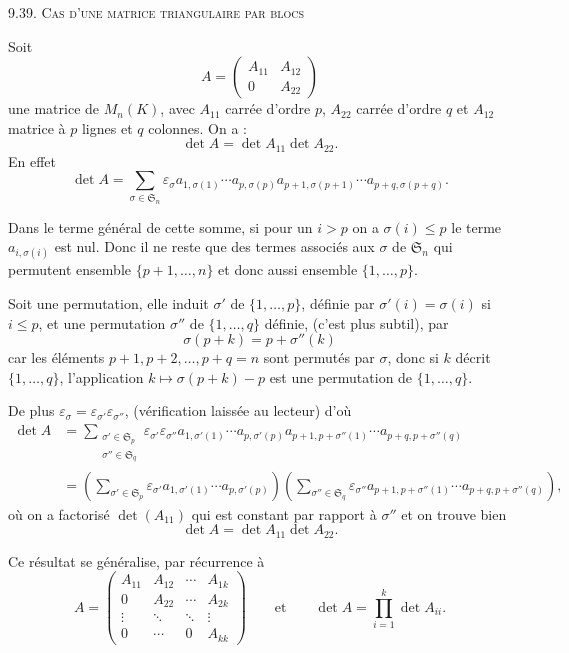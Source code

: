 \medskip\noindent\textsc{9.39. Cas d'une matrice triangulaire par blocs}

Soit
\[
A=\begin{pmatrix}A_{11}&A_{12}\\0&A_{22}\end{pmatrix}
\]
une matrice de $M_n(K)$, avec $A_{11}$ carrée d'ordre $p$, $A_{22}$ carrée d'ordre $q$ et $A_{12}$ matrice à $p$ lignes et $q$ colonnes. On a :
\[
\det A=\det A_{11}\det A_{22}.
\]
En effet
\[
\det A=\sum_{\sigma\in\mathfrak S_n}\varepsilon_\sigma
 a_{1,\sigma(1)}\cdots a_{p,\sigma(p)}a_{p+1,\sigma(p+1)}\cdots a_{p+q,\sigma(p+q)}.
\]

Dans le terme général de cette somme, si pour un $i>p$ on a $\sigma(i)\le p$ le terme $a_{i,\sigma(i)}$ est nul. Donc il ne reste que des termes associés aux $\sigma$ de $\mathfrak S_n$ qui permutent ensemble $\{p+1,\ldots,n\}$ et donc aussi ensemble $\{1,\ldots,p\}$.

Soit une permutation, elle induit  $\sigma'$ de $\{1,\ldots,p\}$, définie par $\sigma'(i)=\sigma(i)$ si $i\le p$, et une permutation $\sigma''$ de $\{1,\ldots,q\}$ définie, (c'est plus subtil), par
\[
\sigma(p+k)=p+\sigma''(k)
\]
car les éléments $p+1,p+2,\ldots,p+q=n$ sont permutés par $\sigma$, donc si $k$ décrit $\{1,\ldots,q\}$, l'application $k\longmapsto\sigma(p+k)-p$ est une permutation de $\{1,\ldots,q\}$.

De plus $\varepsilon_\sigma=\varepsilon_{\sigma'}\varepsilon_{\sigma''}$, (vérification laissée au lecteur) d'où
\[
\begin{aligned}
\det A
&=\sum_{\substack{\sigma'\in\mathfrak S_p\\\sigma''\in\mathfrak S_q}}
\varepsilon_{\sigma'}\varepsilon_{\sigma''}
 a_{1,\sigma'(1)}\cdots a_{p,\sigma'(p)}
 a_{p+1,p+\sigma''(1)}\cdots a_{p+q,p+\sigma''(q)}\\
&=\left(\sum_{\sigma'\in\mathfrak S_p}\varepsilon_{\sigma'}a_{1,\sigma'(1)}\cdots a_{p,\sigma'(p)}\right)
\left(\sum_{\sigma''\in\mathfrak S_q}\varepsilon_{\sigma''}a_{p+1,p+\sigma''(1)}\cdots a_{p+q,p+\sigma''(q)}\right),
\end{aligned}
\]
où on a factorisé $\det(A_{11})$ qui est constant par rapport à $\sigma''$ et on trouve bien
\[
\det A=\det A_{11}\det A_{22}.
\]

Ce résultat se généralise, par récurrence à
\[
A=\begin{pmatrix}
A_{11}&A_{12}&\cdots&A_{1k}\\
0&A_{22}&\cdots&A_{2k}\\
\vdots&\ddots&\ddots&\vdots\\
0&\cdots&0&A_{kk}
\end{pmatrix}
\qquad\text{et}\qquad
\det A=\prod_{i=1}^k\det A_{ii}.
\]

